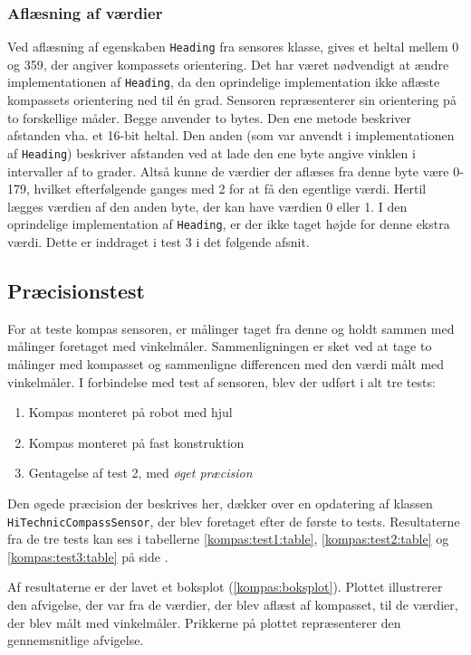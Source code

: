 \subsubsection{Aflæsning af værdier}\label{kompas:reading}
Ved aflæsning af egenskaben \lstinline[style=csharp]!Heading! fra sensores klasse, gives et heltal mellem 0 og 359, der angiver kompassets orientering.
Det har været nødvendigt at ændre implementationen af \lstinline[style=csharp]!Heading!, da den oprindelige implementation ikke aflæste kompassets orientering ned til \'en grad.
Sensoren repræsenterer sin orientering på to forskellige måder.
Begge anvender to bytes.
Den ene metode beskriver afstanden vha. et 16-bit heltal.
Den anden (som var anvendt i implementationen af \lstinline[style=csharp]!Heading!) beskriver afstanden ved at lade den ene byte angive vinklen i intervaller af to grader.
Altså kunne de værdier der aflæses fra denne byte være 0-179, hvilket efterfølgende ganges med 2 for at få den egentlige værdi.
Hertil lægges værdien af den anden byte, der kan have værdien 0 eller 1.
I den oprindelige implementation af \lstinline[style=csharp]!Heading!, er der ikke taget højde for denne ekstra værdi.
Dette er inddraget i test 3 i det følgende afsnit.

\subsection{Præcisionstest}\label{kompas:precision}
For at teste kompas sensoren, er målinger taget fra denne og holdt sammen med målinger foretaget med vinkelmåler.
Sammenligningen er sket ved at tage to målinger med kompasset og sammenligne differencen med den værdi målt med vinkelmåler.
I forbindelse med test af sensoren, blev der udført i alt tre tests:
\begin{enumerate}
\item Kompas monteret på robot med hjul
\item Kompas monteret på fast konstruktion
\item Gentagelse af test 2, med \textit{øget præcision}
\end{enumerate}
Den øgede præcision der beskrives her, dækker over en opdatering af \mindsqualls klassen \lstinline[style=csharp]!HiTechnicCompassSensor!, der blev foretaget efter de første to tests.
Resultaterne fra de tre tests kan ses i tabellerne \ref{kompas:test1:table}, \ref{kompas:test2:table} og \ref{kompas:test3:table} på side \pageref{kompas:test1:table}.

Af resultaterne er der lavet et boksplot (\cref{kompas:boksplot}).
Plottet illustrerer den afvigelse, der var fra de værdier, der blev aflæst af kompasset, til de værdier, der blev målt med vinkelmåler.
Prikkerne på plottet repræsenterer den gennemsnitlige afvigelse.

